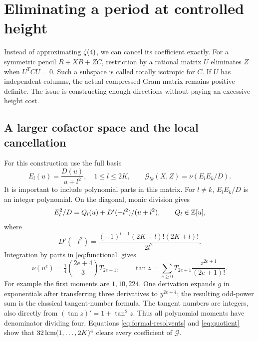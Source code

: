 \section{Eliminating a period at controlled height}\label{sec:compression}
Instead of approximating $\zeta(4)$, we can cancel its coefficient exactly.
For a symmetric pencil $R+XB+ZC$, restriction by a rational matrix $U$
eliminates $Z$ when $U^TCU=0$. Such a subspace is called totally
isotropic for $C$. If $U$ has independent columns, the actual compressed
Gram matrix remains positive definite. The issue is constructing enough
directions without paying an excessive height cost.

\subsection{A larger cofactor space and the local cancellation}
For this construction use the full basis
\[
 E_l(u)=\frac{D(u)}{u+l^2},\quad 1\leq l\leq2K,
 \qquad \mathcal G_{lk}(X,Z)=\nu(E_lE_k/D).
\]
It is important to include polynomial parts in this matrix. For $l\ne k$,
$E_lE_k/D$ is an integer polynomial. On the diagonal, monic division
gives
\begin{equation}\label{eq:quotient}
 E_l^2/D=Q_l(u)+D'(-l^2)/(u+l^2),\qquad Q_l\in\mathbb Z[u],
\end{equation}
where
\begin{equation}\label{eq:Dprime}
 D'(-l^2)=\frac{(-1)^{l-1}(2K-l)!(2K+l)!}{2l^2}.
\end{equation}
Integration by parts in \eqref{eq:functional} gives
\begin{equation}\label{eq:moments}
 \nu(u^e)=\tfrac14\binom{2e+4}{3}T_{2e+1},
 \qquad \tan z=\sum_{e\geq0}T_{2e+1}\frac{z^{2e+1}}{(2e+1)!}.
\end{equation}
For example the first moments are $1,10,224$. One derivation expands
$g$ in exponentials after transferring three derivatives to $y^{2e+4}$;
the resulting odd-power sum is the classical tangent-number formula.
The tangent numbers are integers, also directly from
$(\tan z)'=1+\tan^2z$. Thus all polynomial moments have denominator
dividing four. Equations \eqref{eq:formal-resolvents} and
\eqref{eq:quotient} show that $32\operatorname{lcm}(1,\ldots,2K)^4$ clears every
coefficient of $\mathcal G$.


